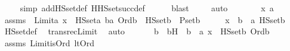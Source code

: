 \begin{isabellebody}
\ \ \ \isamarkupfalse%
\ {\isacharparenleft}{\kern0pt}simp\ add{\isacharcolon}{\kern0pt}HS{\isacharunderscore}{\kern0pt}set{\isacharunderscore}{\kern0pt}def\ HHS{\isacharunderscore}{\kern0pt}set{\isacharunderscore}{\kern0pt}succ{\isacharunderscore}{\kern0pt}def{\isacharparenright}{\kern0pt}\ \isanewline
\ \ \ \isamarkupfalse%
\ blast\ \isanewline
\ \ \isamarkupfalse%
\ auto\ \isanewline
{}\isamarkupfalse%
\ {\isacharminus}{\kern0pt}\ \isanewline
\ \ \isamarkupfalse%
\ x\ a\ \isamarkupfalse%
\ assms\ {\isacharcolon}{\kern0pt}\ {\isachardoublequoteopen}Limit{\isacharparenleft}{\kern0pt}a{\isacharparenright}{\kern0pt}{\isachardoublequoteclose}\ {\isachardoublequoteopen}x\ {\isasymin}\ HS{\isacharunderscore}{\kern0pt}set{\isacharparenleft}{\kern0pt}a{\isacharparenright}{\kern0pt}{\isachardoublequoteclose}\ {\isachardoublequoteopen}{\isasymforall}b{\isasymin}a{\isachardot}{\kern0pt}\ Ord{\isacharparenleft}{\kern0pt}b{\isacharparenright}{\kern0pt}\ {\isasymlongrightarrow}\ HS{\isacharunderscore}{\kern0pt}set{\isacharparenleft}{\kern0pt}b{\isacharparenright}{\kern0pt}\ {\isasymsubseteq}\ P{\isacharunderscore}{\kern0pt}set{\isacharparenleft}{\kern0pt}b{\isacharparenright}{\kern0pt}{\isachardoublequoteclose}\isanewline
\ \ \isamarkupfalse%
\ \isamarkupfalse%
\ {\isachardoublequoteopen}x\ {\isasymin}\ {\isacharparenleft}{\kern0pt}{\isasymUnion}b\ {\isacharless}{\kern0pt}\ a{\isachardot}{\kern0pt}\ HS{\isacharunderscore}{\kern0pt}set{\isacharparenleft}{\kern0pt}b{\isacharparenright}{\kern0pt}{\isacharparenright}{\kern0pt}{\isachardoublequoteclose}\ \isamarkupfalse%
\ HS{\isacharunderscore}{\kern0pt}set{\isacharunderscore}{\kern0pt}def\ \isamarkupfalse%
\ transrec{}{\isacharunderscore}{\kern0pt}Limit\ \isamarkupfalse%
\ auto\ \isanewline
\ \ \isamarkupfalse%
\ \isamarkupfalse%
\ b\ \ bH\ {\isacharcolon}{\kern0pt}\ {\isachardoublequoteopen}b\ {\isacharless}{\kern0pt}\ a{\isachardoublequoteclose}\ {\isachardoublequoteopen}x\ {\isasymin}\ HS{\isacharunderscore}{\kern0pt}set{\isacharparenleft}{\kern0pt}b{\isacharparenright}{\kern0pt}{\isachardoublequoteclose}\ {\isachardoublequoteopen}Ord{\isacharparenleft}{\kern0pt}b{\isacharparenright}{\kern0pt}{\isachardoublequoteclose}\ \isamarkupfalse%
\ assms\ Limit{\isacharunderscore}{\kern0pt}is{\isacharunderscore}{\kern0pt}Ord\ lt{\isacharunderscore}{\kern0pt}Ord\ \isamarkupfalse%

\end{isabellebody}
